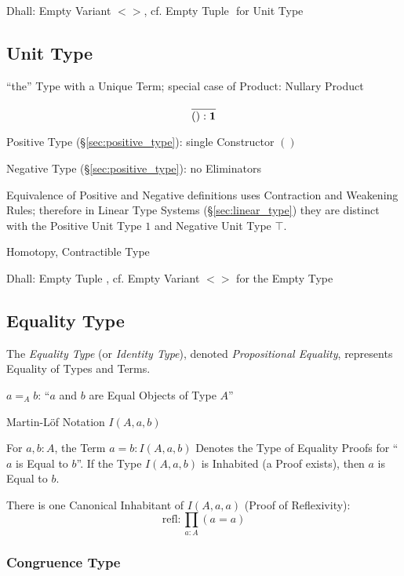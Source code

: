 Dhall: Empty Variant $<>$, cf. Empty Tuple ${}$ for Unit Type



\subsection{Unit Type}\label{sec:unit_type}

``the'' Type with a Unique Term; special case of Product: Nullary
Product

\[
  \frac{}
  {():\mathbf{1}}
\]

Positive Type (\S\ref{sec:positive_type}): single Constructor $()$

Negative Type (\S\ref{sec:positive_type}): no Eliminators

Equivalence of Positive and Negative definitions uses Contraction and
Weakening Rules; therefore in Linear Type Systems
(\S\ref{sec:linear_type}) they are distinct with the Positive Unit
Type $1$ and Negative Unit Type $\top$.

Homotopy, Contractible Type %

Dhall: Empty Tuple ${}$, cf. Empty Variant $<>$ for the Empty Type



\subsection{Equality Type}\label{sec:equality_type}

The \emph{Equality Type} (or \emph{Identity Type}), denoted
\emph{Propositional Equality}, represents Equality of Types and Terms.

$a =_A b$: ``$a$ and $b$ are Equal Objects of Type $A$''

Martin-L\"of Notation $I(A,a,b)$

For $a,b:A$, the Term $a = b : I(A,a,b)$ Denotes the Type of Equality
Proofs for ``$a$ is Equal to $b$''. If the Type $I(A,a,b)$ is
Inhabited (a Proof exists), then $a$ is Equal to $b$.

There is one Canonical Inhabitant of $I(A,a,a)$ (Proof of
Reflexivity):
\[
  \text{refl}: \prod_{a:A} (a=a)
\]



\subsubsection{Congruence Type}\label{sec:congruence_type}


